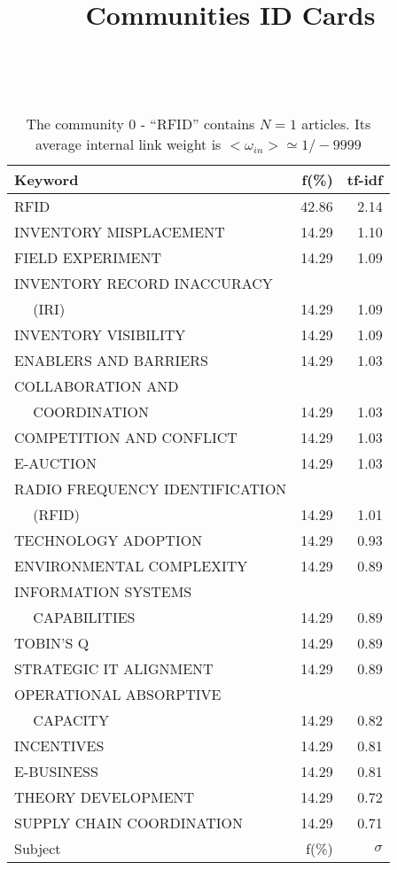 \documentclass[a4paper,11pt]{report}
\title{{\bf Communities ID Cards}}
\date{\begin{flushleft}This document gather the ``ID Cards'' of the CC communities found within your database.\\
 The CC network was built by keeping a link between articles sharing at least 5 references. The communities characterized here correspond to the ones found in the level 0 (in the sense of the Louvain algo) which gathers more than 0 articles.\\
 These ID cards displays the most frequent keywords, subject categories, journals of publication, institution, countries, authors, references and reference journals of the articles of each community. The significance of an item $\sigma = \sqrt{N} (f - p) / \sqrt{p(1-p)}$ [where $N$ is the number of articles within the community and $f$ and $p$ are the proportion of articles respectively within the community and within the database displaying that item ] is also given (for example $\sigma > 5$ is really highly significant). The tf-idf value which can be calculated by $tf-idf = f*log(frac{1}{p})$ is also given.\\
\vspace{1cm}
\copyright Sebastian Grauwin, Liu Weizhi - (2014) \end{flushleft}}
\begin{document}
\begin{landscape}
\maketitle
\clearpage

\begin{table}[!ht]
\caption{The community 0 - ``RFID'' contains $N = 1$ articles. Its average internal link weight is $<\omega_{in}> \simeq 1/-9999$ }
\textcolor{white}{aa}\\
{\scriptsize\begin{tabular}{|l r  r|}
\hline
Keyword & f(\%) & tf-idf \\
\hline
RFID & 42.86 & 2.14\\
INVENTORY MISPLACEMENT & 14.29 & 1.10\\
FIELD EXPERIMENT & 14.29 & 1.09\\
INVENTORY RECORD INACCURACY &  &\\
$\quad$ (IRI) & 14.29 & 1.09\\
INVENTORY VISIBILITY & 14.29 & 1.09\\
ENABLERS AND BARRIERS & 14.29 & 1.03\\
COLLABORATION AND &  &\\
$\quad$ COORDINATION & 14.29 & 1.03\\
COMPETITION AND CONFLICT & 14.29 & 1.03\\
E-AUCTION & 14.29 & 1.03\\
RADIO FREQUENCY IDENTIFICATION &  &\\
$\quad$ (RFID) & 14.29 & 1.01\\
TECHNOLOGY ADOPTION & 14.29 & 0.93\\
ENVIRONMENTAL COMPLEXITY & 14.29 & 0.89\\
INFORMATION SYSTEMS &  &\\
$\quad$ CAPABILITIES & 14.29 & 0.89\\
TOBIN'S Q & 14.29 & 0.89\\
STRATEGIC IT ALIGNMENT & 14.29 & 0.89\\
OPERATIONAL ABSORPTIVE &  &\\
$\quad$ CAPACITY & 14.29 & 0.82\\
INCENTIVES & 14.29 & 0.81\\
E-BUSINESS & 14.29 & 0.81\\
THEORY DEVELOPMENT & 14.29 & 0.72\\
SUPPLY CHAIN COORDINATION & 14.29 & 0.71\\
\hline
\hline
Subject & f(\%) & $\sigma$\\

\end{tabular}}
\end{table}
\end{landscape}
\end{document}

